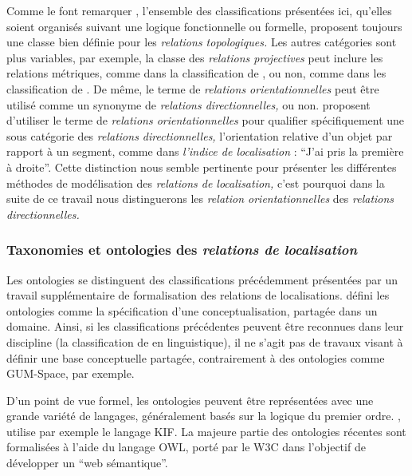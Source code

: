 Comme le font remarquer \textcite{Duchene2019}, l'ensemble des
classifications présentées ici, qu'elles soient organisés suivant une
logique fonctionnelle ou formelle, proposent toujours une classe bien
définie pour les \emph{relations topologiques.} Les autres catégories
sont plus variables, par exemple, la classe des \emph{relations
  projectives} peut inclure les relations métriques, comme dans la
classification de \textcite{Borillo1998}, ou non, comme dans les
classification de \textcite{Bateman2010, Pustejovsky2017}. De même, le
terme de \emph{relations orientationnelles} peut être utilisé comme un
synonyme de \emph{relations directionnelles,} ou
non. \textcite{Duchene2019} proposent d'utiliser le terme de
\emph{relations orientationnelles} pour qualifier spécifiquement une
sous catégorie des\emph{ relations directionnelles,} l'orientation
relative d'un objet par rapport à un segment, comme dans
\emph{l'indice de localisation} : \enquote{J'ai pris la première à
  droite}. Cette distinction nous semble pertinente pour présenter les
différentes méthodes de modélisation des \emph{relations de
  localisation,} c'est pourquoi dans la suite de ce travail nous
distinguerons les \emph{relation orientationnelles} des
\emph{relations directionnelles.}

\subsubsection{Taxonomies et ontologies des \emph{relations de localisation}}

Les ontologies se distinguent des classifications précédemment
présentées par un travail supplémentaire de formalisation des
relations de localisations. \textcite{Gruber1993} défini les
ontologies comme la spécification d'une conceptualisation, partagée
dans un domaine. Ainsi, si les classifications précédentes peuvent
être reconnues dans leur discipline (\eg la classification de
\textcite{Borillo1998} en linguistique), il ne s'agit pas de travaux
visant à définir une base conceptuelle partagée, contrairement à des
ontologies comme GUM-Space, par exemple.

D'un point de vue formel, les ontologies peuvent être représentées
avec une grande variété de langages, généralement basés sur la logique
du premier ordre. \textcite{Gruber1993}, utilise par exemple le
langage KIF. La majeure partie des ontologies récentes sont
formalisées à l'aide du langage OWL, porté par le W3C dans l'objectif
de développer un \enquote{web sémantique}.


